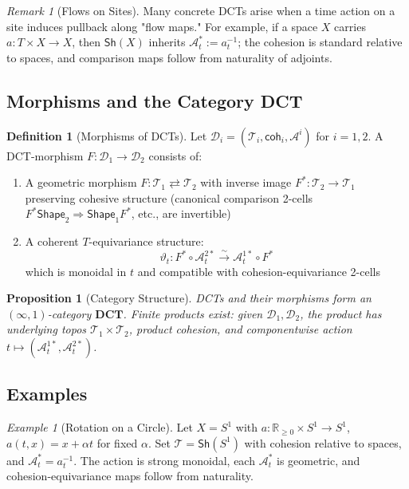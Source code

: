 \documentclass[11pt]{article}
\theoremstyle{definition}
\newtheorem{definition}{Definition}
\theoremstyle{plain}
\newtheorem{proposition}{Proposition}
\theoremstyle{remark}
\newtheorem{remark}{Remark}
\newtheorem{example}{Example}
\begin{document}
\begin{remark}[Flows on Sites]
Many concrete DCTs arise when a time action on a site induces pullback along "flow maps." For example, if a space $X$ carries $a: T \times X \to X$, then $\mathsf{Sh}(X)$ inherits $\mathcal{A}^*_t := a^{-1}_t$; the cohesion is standard relative to spaces, and comparison maps follow from naturality of adjoints.
\end{remark}

\subsection{Morphisms and the Category DCT}

\begin{definition}[Morphisms of DCTs]
Let $\mathcal{D}_i = (\mathcal{T}_i, \mathsf{coh}_i, \mathcal{A}^i)$ for $i = 1,2$. A DCT-morphism $F: \mathcal{D}_1 \to \mathcal{D}_2$ consists of:
\begin{enumerate}
\item A geometric morphism $F: \mathcal{T}_1 \rightleftarrows \mathcal{T}_2$ with inverse image $F^*: \mathcal{T}_2 \to \mathcal{T}_1$ preserving cohesive structure (canonical comparison 2-cells $F^*\mathsf{Shape}_2 \Rightarrow \mathsf{Shape}_1 F^*$, etc., are invertible)
\item A coherent $T$-equivariance structure:
\[
\vartheta_t: F^* \circ \mathcal{A}^{2*}_t \xrightarrow{\sim} \mathcal{A}^{1*}_t \circ F^*
\]
which is monoidal in $t$ and compatible with cohesion-equivariance 2-cells
\end{enumerate}
\end{definition}

\begin{proposition}[Category Structure]
DCTs and their morphisms form an $(\infty,1)$-category $\mathbf{DCT}$. Finite products exist: given $\mathcal{D}_1, \mathcal{D}_2$, the product has underlying topos $\mathcal{T}_1 \times \mathcal{T}_2$, product cohesion, and componentwise action $t \mapsto (\mathcal{A}^{1*}_t, \mathcal{A}^{2*}_t)$.
\end{proposition}

\subsection{Examples}

\begin{example}[Rotation on a Circle]
Let $X = S^1$ with $a: \mathbb{R}_{\geq 0} \times S^1 \to S^1$, $a(t,x) = x + \alpha t$ for fixed $\alpha$. Set $\mathcal{T} = \mathsf{Sh}(S^1)$ with cohesion relative to spaces, and $\mathcal{A}^*_t = a^{-1}_t$. The action is strong monoidal, each $\mathcal{A}^*_t$ is geometric, and cohesion-equivariance maps follow from naturality.
\end{example}
\end{document}
